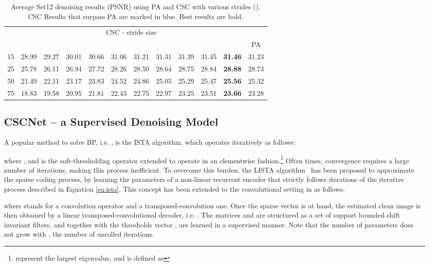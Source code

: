 \documentclass{article}
\begin{document}
\begin{table}[t]
\centering
\caption{Average Set12 denoising results (PSNR) using PA and CSC with various strides (). CSC Results that surpass PA are marked in blue. Best results are bold.}
\label{table:csc_vs_pa}
\begin{tabular}{@{}cccccccccccc@{}}
\toprule
         & \multicolumn{10}{c}{CSC - stride size }                                                               &       \\ \cmidrule(lr){2-11}
 &  &  &  &  &  &  &  &  &  &          & PA    \\ \midrule
15       & 28.99 & 29.27 & 30.01 & 30.66 & 31.06 & 31.21 & {\color{blue}31.31} & {\color{blue}31.39} & {\color{blue}31.45} & {\color{blue}\textbf{31.46}} & 31.23 \\
25       & 25.78 & 26.11 & 26.94 & 27.72 & 28.26 & 28.50 & 28.64 & {\color{blue}28.75} & {\color{blue}28.84} & {\color{blue}\textbf{28.88}} & 28.73 \\
50       & 21.49 & 22.11 & 23.17 & 23.83 & 24.52 & 24.86 & 25.05 & 25.29 & {\color{blue}25.47} & {\color{blue}\textbf{25.56}} & 25.32 \\
75       & 18.83 & 19.58 & 20.95 & 21.81 & 22.43 & 22.75 & 22.97 & 23.25 & {\color{blue}23.51} & {\color{blue}\textbf{23.66}} & 23.28 \\ \bottomrule
\end{tabular}
\end{table}

\subsection{CSCNet -- a Supervised Denoising Model}
A popular method to solve BP, i.e. ,
is the ISTA algorithm, which operates iteratively as follows:

where , and  is the soft-thresholding operator extended to operate in an elementwise fashion.\footnote{ represent the largest eigenvalue, and  is defined as }
Often times, convergence requires a large number of iterations, making this process inefficient. To overcome this burden, the LISTA algorithm~\cite{gregor2010learning} has been proposed to approximate the sparse coding process, by learning the parameters of a non-linear recurrent encoder that strictly follows  iterations of the iterative process described in Equation \eqref{eq:ista}. This concept has been extended to the convolutional setting in \cite{sreter2018learned} as follows:

where  stands for a convolution operator and  a transposed-convolution one.
Once the sparse vector is at hand, the estimated clean image is then obtained by a linear transposed-convolutional decoder, i.e. . The matrices  and  are structured as a set of support bounded shift invariant filters, and together with the thresholds vector , are learned in a supervised manner. Note that the number of parameters does not grow with , the number of unrolled iterations.
\end{document}
